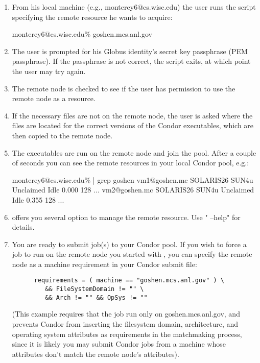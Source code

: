 \begin{enumerate}

\item From his local machine (e.g., monterey6@cs.wisc.edu) the user runs 
   the  script specifying the remote resource he wants 
   to acquire:

monterey6@cs.wisc.edu\%  goshen.mcs.anl.gov

\item The user is prompted for his Globus identity's secret key passphrase
   (PEM passphrase). If the passphrase is not correct, the script exits,
   at which point the user may try again.

\item The remote node is checked to see if the user has permission to
   use the remote node as a resource.

\item If the necessary files are not on the remote node, the user
   is asked where the files are located for the correct versions of
   the Condor executables, which are then copied to the remote node.

\item The executables are run on the remote node and join the pool.
   After a couple of seconds you can see the remote resources in your 
   local Condor pool, e.g.:

   monterey6@cs.wisc.edu\%  | grep goshen
      vm1@goshen.mc SOLARIS26   SUN4u  Unclaimed  Idle       0.000   128 ...
      vm2@goshen.mc SOLARIS26   SUN4u  Unclaimed  Idle       0.355   128 ...

\item {} offers you several option to manage the remote resource. 
   Use " --help" for details.

\item You are ready to submit job(s) to your Condor pool. If you wish to force
   a job to run on the remote node you started with , you can
   specify the remote node as a machine requirement in your Condor submit
   file: 
\begin{verbatim}
      requirements = ( machine == "goshen.mcs.anl.gov" ) \
         && FileSystemDomain != "" \
         && Arch != "" && OpSys != ""
\end{verbatim}
   (This example requires that the job run only on goshen.mcs.anl.gov, and
   prevents Condor from inserting the filesystem domain, architecture, and 
   operating system attributes as requirements in the matchmaking process,
   since it is likely you may submit Condor jobs from a machine whose
   attributes don't match the remote node's attributes).

\end{enumerate}

